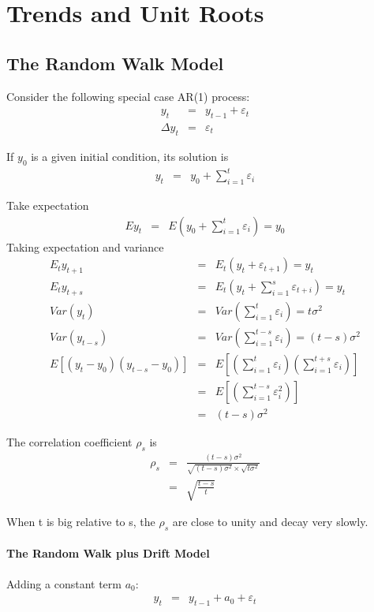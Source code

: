\section[Trends and Unit Roots]{Trends and Unit Roots}
\subsection{The Random Walk Model}
Consider the following special case AR(1) process:
\begin{eqnarray*}
y_{t}&=&y_{t-1}+\varepsilon_{t}\\
\Delta y_{t}&=&\varepsilon_{t}
\end{eqnarray*}

If $y_{0}$ is a given initial condition, its solution is
\begin{eqnarray*}
y_{t}&=&y_{0}+\sum_{i=1}^{t}\varepsilon_{i}
\end{eqnarray*}

Take expectation
\begin{eqnarray*}
Ey_{t}&=& E\left(y_{0}+\sum_{i=1}^{t}\varepsilon_{i}\right)=y_{0}
\end{eqnarray*}
Taking expectation and variance
\begin{eqnarray*}
E_{t}y_{t+1}&=&E_{t}\left(y_{t}+\varepsilon_{t+1}\right)=y_{t}\\
E_{t}y_{t+s}&=&E_{t}\left(y_{t}+\sum_{i=1}^{s}\varepsilon_{t+i}\right)=y_{t}\\
Var(y_{t})&=&Var\left(\sum_{i=1}^{t}\varepsilon_{i}\right)=t\sigma^{2}\\
Var(y_{t-s})&=&Var\left(\sum_{i=1}^{t-s}\varepsilon_{i}\right)=(t-s)\sigma^{2}\\
E\left[(y_{t}-y_{0})(y_{t-s}-y_{0})\right]&=&E\left[(\sum_{i=1}^{t}\varepsilon_{i} )(\sum_{i=1}^{t+s}\varepsilon_{i})\right]\\
								&=&E\left[(\sum_{i=1}^{t-s}\varepsilon_{i}^{2} )\right]\\
								&=&(t-s)\sigma^{2}
\end{eqnarray*}

The correlation coefficient $\rho_{s}$ is
\begin{eqnarray*}
\rho_{s}&=&\frac{(t-s)\sigma^{2}}{\sqrt{(t-s)\sigma^{2}}\times \sqrt{t\sigma^{2}}}\\
&=&\sqrt{\frac{t-s}{t}}
\end{eqnarray*}

When t is big relative to s, the $\rho_{s}$  are close to unity and decay very slowly. 

\paragraph{The Random Walk plus Drift Model}
Adding a constant term $a_{0}$:
\begin{eqnarray*}
y_{t}&=&y_{t-1}+a_{0}+\varepsilon_{t}
\end{eqnarray*}

